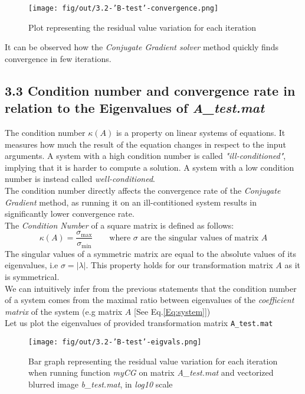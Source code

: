 \documentclass[unicode,11pt,a4paper,oneside,numbers=endperiod,openany]{scrartcl}
\begin{document}
\begin{figure}[h!]
    \centering
    \texttt{[image: fig/out/3.2-'B-test'-convergence.png]}
    \caption{Plot representing the residual value variation for each iteration}
    \label{fig:residual_variation}
\end{figure}
It can be observed how the \textit{Conjugate Gradient solver} method quickly finds convergence in few iterations.

\subsection*{\normalsize{3.3 Condition number and convergence rate in relation to the Eigenvalues of \textit{A\_test.mat}}}
\label{condition_number}
The condition number $\kappa (A)$ is a property on linear systems of equations. It measures how much the result of the equation changes in respect to the input arguments. A system with a high condition number is called \textit{"ill-conditioned"}, implying that it is harder to compute a solution. A system with a low condition number is instead called \textit{well-conditioned}.\\
The condition number directly affects the convergence rate of the \textit{Conjugate Gradient} method, as running it on an ill-contitioned system results in significantly lower convergence rate.\\
The \textit{Condition Number} of a square matrix is defined as follows:\\
$$
\kappa (A) = \frac{\sigma_{\text{max}}}{\sigma_{\text{min}}} \qquad \text{where $\sigma$ are the singular values of matrix $A$}
$$
The singular values of a symmetric matrix are equal to the absolute values of its eigenvalues, i.e $\sigma = |\lambda|$. This property holds for our transformation matrix $A$ as it is symmetrical.\\
We can intuitively infer from the previous statements that the condition number of a system comes from the maximal ratio between eigenvalues of the \textit{coefficient matrix} of the system (e.g matrix $A$ [See Eq.\ref{Eq:system}])\\
Let us plot the eigenvalues of provided transformation matrix \verb|A_test.mat|
\begin{figure}[H]
    \centering
    \texttt{[image: fig/out/3.2-'B-test'-eigvals.png]}
    \caption{Bar graph representing the residual value variation for each iteration when running function \textit{myCG} on matrix \textit{A\_test.mat} and vectorized blurred image \textit{b\_test.mat}, in \textit{log10} scale}
    \label{fig:eigvals}
\end{figure}
\end{document}
